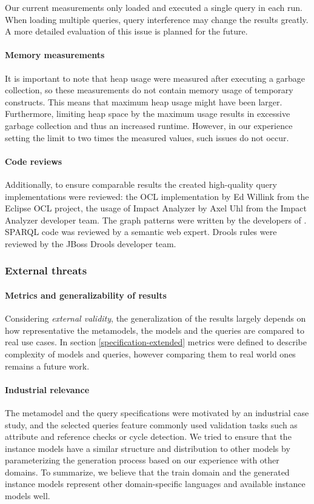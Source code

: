 Our current measurements only loaded and executed a single query in each run.
When loading multiple queries, query interference may change the results
greatly. A more detailed evaluation of this issue is planned for the future.


\paragraph{Memory measurements}
It is important to note that heap usage were measured after executing a garbage
collection, so these measurements do not contain memory usage of temporary
constructs. This means that maximum heap usage might have been larger. Furthermore,
limiting heap space by the maximum usage results in excessive garbage collection
and thus an increased runtime. However, in our experience setting the limit to
two times the measured values, such issues do not occur.



\paragraph{Code reviews}
Additionally, to ensure comparable
results the created high-quality query implementations were reviewed: the OCL
implementation by Ed Willink from the Eclipse OCL project, the usage of Impact
Analyzer by Axel Uhl from the Impact Analyzer developer team. The graph patterns
were written by the developers of \eiq{}. SPARQL code was reviewed by a semantic web expert. Drools rules were reviewed by the JBoss Drools developer team. 

\subsubsection{External threats}

\paragraph{Metrics and generalizability of results}
Considering \emph{external validity}, the generalization of the results largely
depends on how representative the metamodels, the models and the queries are
compared to real use cases. In section \ref{specification-extended} metrics were
defined to describe complexity of models and queries, however comparing them to
real world ones remains a future work.

\paragraph{Industrial relevance}
The metamodel and the query specifications were motivated by an industrial case
study, and the selected queries feature commonly used validation tasks such as
attribute and reference checks or cycle detection. We tried to ensure that the
instance models have a similar structure and distribution to other models by
parameterizing the generation process based on our experience with other
domains. To summarize, we believe that the train domain and the generated
instance models represent other domain-specific languages and available instance
models well.

